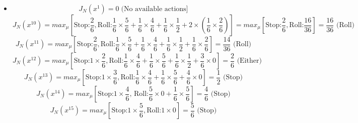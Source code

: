 \documentclass[11pt]{article}
\newenvironment{problem}[2][Problem]{\begin{trivlist}
\item[\hskip \labelsep {\bfseries #1}\hskip \labelsep {\bfseries #2.}]}{\end{trivlist}}
\begin{document}
\begin{problem}{4}
\begin{itemize}
		
		\item[Roll 2]	
		\begin{equation}
			J_N(x^1) = 0 \; \text{(No available actions]}
		\end{equation}
		\begin{equation}
			J_N(x^{10}) = max_{\mu} \left[ \text{Stop:} \frac{2}{6}, \text{Roll:} \frac{1}{6} \times \frac{5}{6} + \frac{1}{6} \times \frac{4}{6} + \frac{1}{6} \times \frac{1}{2} + 2 \times (\frac{1}{6} \times \frac{2}{6})\right] = max_{\mu} \left[ \text{Stop:} \frac{2}{6}, \text{Roll:} \frac{16}{36}\right] = \frac{16}{36} \text{ (Roll)}
		\end{equation}
		\begin{equation}
			J_N(x^{11}) = max_{\mu} \left[ \text{Stop:} \frac{2}{6}, \text{Roll:} \frac{1}{6} \times \frac{5}{6} + \frac{1}{6} \times \frac{4}{6} + \frac{1}{6} \times \frac{1}{2} + \frac{1}{6} \times \frac{2}{6}\right] = \frac{14}{36} \text{ (Roll)}
		\end{equation}
		\begin{equation}
			J_N(x^{12}) = max_{\mu} \left[ \text{Stop:} 1 \times \frac{2}{6}, \text{Roll:} \frac{1}{6} \times \frac{4}{6} + \frac{1}{6} \times \frac{5}{6} + \frac{1}{6} \times \frac{1}{2} + \frac{3}{6} \times 0 \right] = \frac{2}{6} \text{ (Either)}
		\end{equation}
		\begin{equation}
			J_N(x^{13}) = max_{\mu} \left[ \text{Stop:} 1 \times \frac{3}{6}, \text{Roll:} \frac{1}{6} \times \frac{4}{6} + \frac{1}{6} \times \frac{5}{6} + \frac{4}{6} \times 0 \right] = \frac{1}{2} \text{ (Stop)}
		\end{equation}
		\begin{equation}
			J_N(x^{14}) = max_{\mu} \left[ \text{Stop:} 1 \times \frac{4}{6} \text{, Roll:} \frac{5}{6} \times 0 + \frac{1}{6} \times \frac{5}{6}\right] = \frac{4}{6} \text{ (Stop)}
		\end{equation}
		\begin{equation}
			J_N(x^{15}) = max_{\mu} \left[ \text{Stop:} 1 \times \frac{5}{6}, \text{Roll:} 1 \times 0 \right] = \frac{5}{6} \text{ (Stop)}
		\end{equation}
		
		
		
		
		

\end{itemize}
\end{problem}
\end{document}
